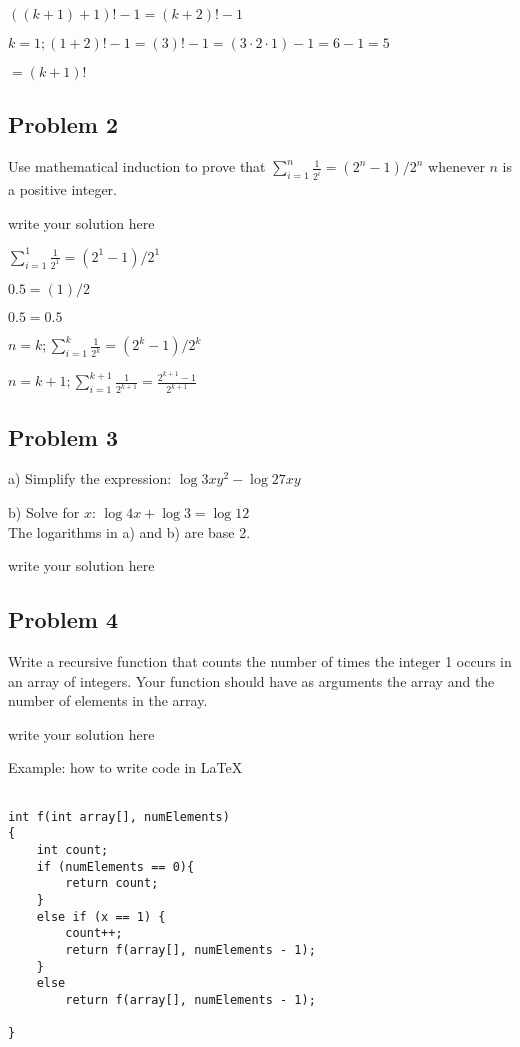 \documentclass[11pt]{article}
\begin{document}
\noindent $((k+1) + 1)! - 1 = (k + 2)! - 1$

\noindent $k=1; (1+2)! - 1 = (3)! - 1 = (3\cdot 2\cdot 1) - 1 = 6 - 1 = 5$

\noindent $=(k+1)!$




\subsection*{{\bf \textsf{Problem 2}}}
Use mathematical induction to prove that $\sum_{i=1}^{n}{\frac{1}{2^i}}=(2^n-1)/2^n$
whenever $n$ is a positive integer.

\vspace*{0.2cm}
write your solution here

\noindent $\sum_{i=1}^{1}{\frac{1}{2^1}}=(2^1-1)/2^1$

\noindent $0.5 = (1)/2$

\noindent $0.5 = 0.5$

\noindent $n=k; \sum_{i=1}^{k}{\frac{1}{2^k}}=(2^k - 1)/2^k$

\noindent $n=k+1; \sum_{i=1}^{k+1}{\frac{1}{2^{k+1}}}={\frac{2^{k+1} - 1}{2^{k+1}}}$




\subsection*{{\bf \textsf{Problem 3}}}
a) Simplify the expression:
$\log 3xy^2 -\log27 xy$

b) Solve for $x$:
$\log 4x + \log 3 = \log 12$\\
The logarithms in a) and b) are base 2.

\vspace*{0.2cm}
write your solution here






\subsection*{{\bf \textsf{Problem 4}}}
Write a recursive function that counts the number of times the integer 1 occurs in an
array of integers. Your function should have as arguments the array and the 
number of elements in the array.

\vspace*{0.2cm}
write your solution here


\noindent Example: how to write code in \LaTeX
\begin{verbatim}

int f(int array[], numElements)
{
	int count;
	if (numElements == 0){
		return count;
	}
	else if (x == 1) {
		count++;
		return f(array[], numElements - 1);
	}
	else
		return f(array[], numElements - 1);
	
}	

\end{verbatim}
\end{document}
